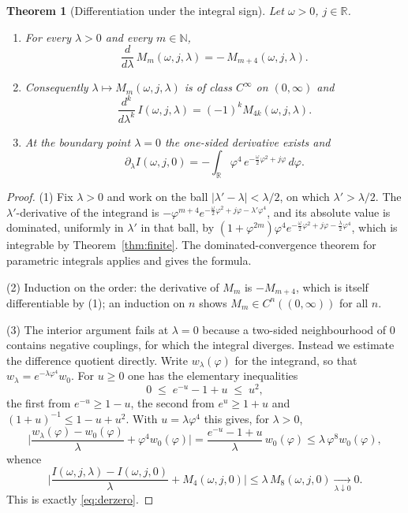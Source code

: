 \documentclass[10pt,a4paper]{amsart}
\newtheorem{theorem}{Theorem}
\newcommand{\N}{\mathbb{N}}
\newcommand{\R}{\mathbb{R}}
\begin{document}
\begin{theorem}[Differentiation under the integral sign]
\label{thm:diff}
Let $\omega>0$, $j\in\R$.
\begin{enumerate}
\item For every $\lambda>0$ and every $m\in\N$,
\[
\frac{d}{d\lambda}\,M_m(\omega,j,\lambda)=-\,M_{m+4}(\omega,j,\lambda).
\]
\item Consequently $\lambda\mapsto M_m(\omega,j,\lambda)$ is of class $C^{\infty}$ on
$(0,\infty)$ and
\[
\frac{d^{k}}{d\lambda^{k}}\,I(\omega,j,\lambda)=(-1)^{k}M_{4k}(\omega,j,\lambda).
\]
\item At the boundary point $\lambda=0$ the one-sided derivative exists and
\begin{equation}
\label{eq:derzero}
\partial_\lambda I(\omega,j,0)
=-\int_\R \varphi^{4}\,e^{-\frac{\omega}{2}\varphi^{2}+j\varphi}\,d\varphi .
\end{equation}
\end{enumerate}
\end{theorem}

\begin{proof}
(1) Fix $\lambda>0$ and work on the ball $|\lambda'-\lambda|<\lambda/2$, on which
$\lambda'>\lambda/2$. The $\lambda'$-derivative of the integrand is
$-\varphi^{m+4}e^{-\frac{\omega}{2}\varphi^{2}+j\varphi-\lambda'\varphi^{4}}$, and its
absolute value is dominated, uniformly in $\lambda'$ in that ball, by
$(1+\varphi^{2m})\varphi^{4}e^{-\frac{\omega}{2}\varphi^{2}+j\varphi-\frac{\lambda}{2}\varphi^{4}}$,
which is integrable by Theorem~\ref{thm:finite}. The dominated-convergence theorem for
parametric integrals applies and gives the formula.

(2) Induction on the order: the derivative of $M_m$ is $-M_{m+4}$, which is itself
differentiable by (1); an induction on $n$ shows $M_m\in C^{n}((0,\infty))$ for all $n$.

(3) The interior argument fails at $\lambda=0$ because a two-sided neighbourhood of $0$
contains negative couplings, for which the integral diverges. Instead we estimate the
difference quotient directly. Write $w_\lambda(\varphi)$ for the integrand, so that
$w_\lambda=e^{-\lambda\varphi^{4}}w_0$. For $u\ge0$ one has the elementary inequalities
\[
0\;\le\;e^{-u}-1+u\;\le\;u^{2},
\]
the first from $e^{-u}\ge 1-u$, the second from $e^{u}\ge 1+u$ and
$(1+u)^{-1}\le 1-u+u^{2}$. With $u=\lambda\varphi^{4}$ this gives, for $\lambda>0$,
\[
\Big|\frac{w_\lambda(\varphi)-w_0(\varphi)}{\lambda}+\varphi^{4}w_0(\varphi)\Big|
=\frac{e^{-u}-1+u}{\lambda}\,w_0(\varphi)
\le \lambda\,\varphi^{8}w_0(\varphi),
\]
whence
\[
\Big|\frac{I(\omega,j,\lambda)-I(\omega,j,0)}{\lambda}+M_4(\omega,j,0)\Big|
\le \lambda\,M_8(\omega,j,0)\xrightarrow[\lambda\downarrow0]{}0 .
\]
This is exactly \eqref{eq:derzero}.
\end{proof}
\end{document}
